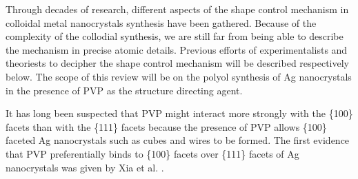 
Through decades of research, different aspects of the shape control mechanism in colloidal metal nanocrystals synthesis have been gathered.
Because of the complexity of the collodial synthesis, we are still far from being able to describe the mechanism in precise atomic details.
Previous efforts of experimentalists and theoriests to decipher the shape control mechanism will be described respectively below.
The scope of this review will be on the polyol synthesis of Ag nanocrystals in the presence of PVP as the structure directing agent.

It has long been suspected that PVP might interact more strongly with the \{100\} facets than with the \{111\} facets because the presence of PVP allows \{100\} faceted Ag nanocrystals such as cubes \cite{Sun_2002b} and wires \cite{Sun_2002} to be formed.
The first evidence that PVP preferentially binds to \{100\} facets over \{111\} facets of Ag nanocrystals was given by Xia et al. \cite{Sun_2003}.
